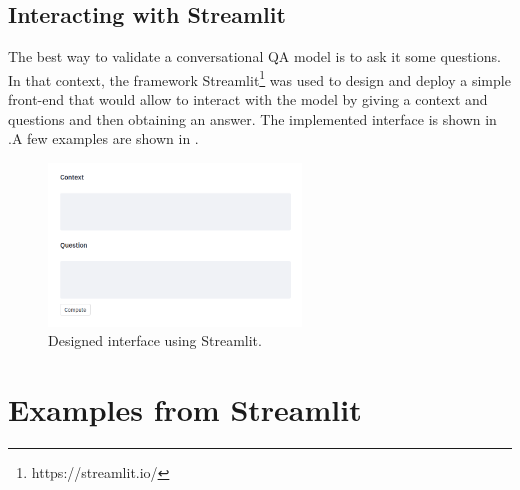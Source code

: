 \documentclass[a4paper, 10pt]{article}
\begin{document}
    \subsection{Interacting with Streamlit}
    
        The best way to validate a conversational QA model is to ask it some questions. In that context, the framework Streamlit\footnote{https://streamlit.io/} was used to design and deploy a simple front-end that would allow to interact with the model by giving a context and questions and then obtaining an answer. The implemented interface is shown in .A few examples are shown in .
        
        \begin{figure}[!htb]
            \centering
            \includegraphics[width=0.6\textwidth]{Figures/streamlit.png}
            \caption{Designed interface using Streamlit.}
            \label{fig:streamlit}
        \end{figure}


\clearpage

      


\clearpage
\appendix

\section{Examples from Streamlit}
\label{sec:examples}
\end{document}
